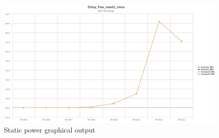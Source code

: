 \documentclass[12pt,  english, makeidx, a4paper, titlepage, oneside]{article}
\begin{document}
\begin{figure}[htbp]
	\begin{center}
		\includegraphics[width=17cm]{img/Delay_Pow_nand2_cmos_Spower.jpeg}
		\caption{Static power graphical output}
		\label{fig:spower_out}
	\end{center}
\end{figure}
\end{document}
